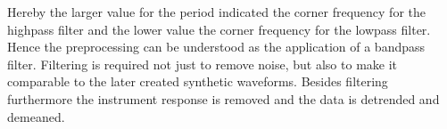 Hereby the larger value for the period indicated the corner frequency for the highpass filter and the lower value the 
corner frequency for the lowpass filter. Hence the preprocessing can be understood as the application of a bandpass filter. 
Filtering is required not just to remove noise, but also to make it comparable to the later created synthetic waveforms.
Besides filtering furthermore the instrument response is removed and the data is detrended and demeaned. 